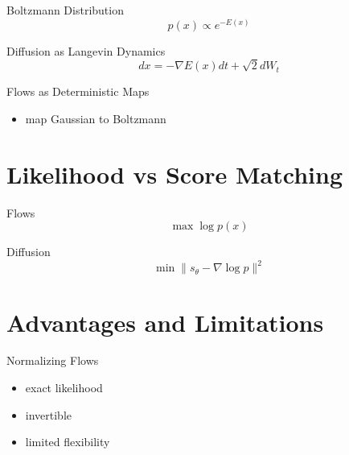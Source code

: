 \documentclass{beamer}
\begin{document}
\begin{frame}{Boltzmann Distribution}
\[
p(x) \propto e^{-E(x)}
\]
\end{frame}


\begin{frame}{Diffusion as Langevin Dynamics}
\[
dx = -\nabla E(x)dt + \sqrt{2}dW_t
\]
\end{frame}


\begin{frame}{Flows as Deterministic Maps}
\begin{itemize}
\item map Gaussian to Boltzmann
\end{itemize}
\end{frame}

\section{Likelihood vs Score Matching}

\begin{frame}{Flows}
\[
\max \log p(x)
\]
\end{frame}


\begin{frame}{Diffusion}
\[
\min \|s_\theta - \nabla \log p\|^2
\]
\end{frame}

\section{Advantages and Limitations}

\begin{frame}{Normalizing Flows}
\begin{itemize}
\item exact likelihood
\item invertible
\item limited flexibility
\end{itemize}
\end{frame}

\end{document}
